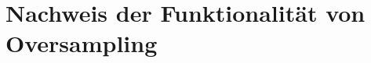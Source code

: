 \clearpage
\section{Nachweis der Funktionalität von Oversampling}\label{oversampling}

\begin{figure}[!b]\centering
    \begin{minipage}{0.5\textwidth}
        \def\myConfMat{{
        { 140,    1,     1,    0,    6,    2},  %
        {   0,  798,     2,   29,    8,   63},  %
        {   3,    2,  1211,   37,   22,   75},  %
        {   1,   16,    21, 3062,   15,  185},  %
        {   4,    5,    16,   28, 1060,   87},  %
        {   1,   25,    42,  174,   36, 5722},  %
        }}

        \def\classNames{{1, 2, 3, 4, 5, 6}} %
        \def\numClasses{6} %
        \def\myScale{1.0} %

\end{minipage}
\end{figure}
